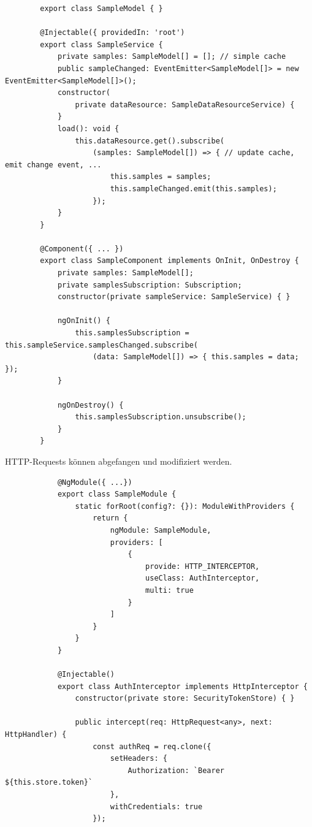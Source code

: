 \documentclass[10pt,landscape]{article}
\begin{document}
\begin{multicols}{2}
        \begin{lstlisting}
        export class SampleModel { }

        @Injectable({ providedIn: 'root')
        export class SampleService {
            private samples: SampleModel[] = []; // simple cache
            public sampleChanged: EventEmitter<SampleModel[]> = new EventEmitter<SampleModel[]>();
            constructor(
                private dataResource: SampleDataResourceService) {
            }
            load(): void {
                this.dataResource.get().subscribe(
                    (samples: SampleModel[]) => { // update cache, emit change event, ...
                        this.samples = samples;
                        this.sampleChanged.emit(this.samples);
                    });
            }
        }

        @Component({ ... })
        export class SampleComponent implements OnInit, OnDestroy {
            private samples: SampleModel[];
            private samplesSubscription: Subscription;
            constructor(private sampleService: SampleService) { }

            ngOnInit() {
                this.samplesSubscription = this.sampleService.samplesChanged.subscribe(
                    (data: SampleModel[]) => { this.samples = data; });
            }

            ngOnDestroy() {
                this.samplesSubscription.unsubscribe();
            }
        }
        \end{lstlisting}

        HTTP-Requests können abgefangen und modifiziert werden.

        \begin{lstlisting}
            @NgModule({ ...})
            export class SampleModule {
                static forRoot(config?: {}): ModuleWithProviders {
                    return {
                        ngModule: SampleModule,
                        providers: [
                            {
                                provide: HTTP_INTERCEPTOR,
                                useClass: AuthInterceptor,
                                multi: true
                            }
                        ]
                    }
                }
            }

            @Injectable()
            export class AuthInterceptor implements HttpInterceptor {
                constructor(private store: SecurityTokenStore) { }

                public intercept(req: HttpRequest<any>, next: HttpHandler) {
                    const authReq = req.clone({
                        setHeaders: {
                            Authorization: `Bearer ${this.store.token}`
                        },
                        withCredentials: true
                    });


\end{lstlisting}
\end{multicols}
\end{document}
